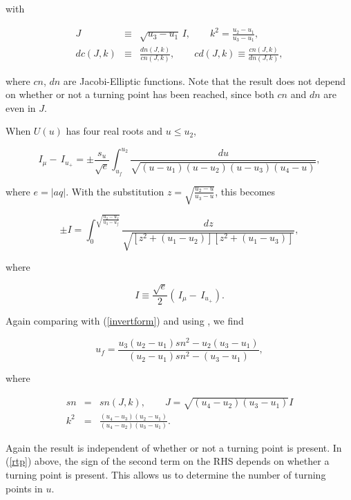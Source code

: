 \documentclass[apj]{emulateapj}
\begin{document}
\noindent with

\begin{eqnarray}
 J &\equiv& \sqrt{u_3-u_1}\hspace{2pt} I, \qquad k^2 = \frac{u_2-u_1}{u_3-u_1}, \\ \nonumber
 dc(J,k) &\equiv& \frac{dn(J,k)}{cn(J,k)},\qquad cd(J,k) \equiv \frac{cn(J,k)}{dn(J,k)},
\end{eqnarray}

\noindent where $cn$, $dn$ are Jacobi-Elliptic functions. Note that the result does not depend on whether or not a turning point has been reached, since both $cn$ and $dn$ are even in $J$.

When $U(u)$ has four real roots and $u \le u_2$, 

\begin{equation}
I_\mu - \hspace{2pt}I_{u_+} = \pm \frac{s_u}{\sqrt{e}}\int_{u_f}^{u_2} \frac{du}{\sqrt{(u-u_1)(u-u_2)(u-u_3)(u_4-u)}},
\end{equation}

\noindent where $e=\vert a q \vert$. With the substitution $z=\sqrt{\frac{u_2-u}{u_3-u}}$, this becomes

\begin{equation}
\pm I = \int_{0}^{\sqrt{\frac{u_2-u_f}{u_3-u_f}}} \frac{dz}{\sqrt{[z^2+(u_1-u_2)][z^2+(u_1-u_3)]}},
\end{equation}

\noindent where 

\begin{equation}
I \equiv \frac{\sqrt{e}}{2} \left(\hspace{2pt}I_\mu - \hspace{2pt}I_{u_+}\right).
\end{equation}

Again comparing with (\ref{invertform}) and using \citet{carlson2005}, we find

\begin{equation}
 u_f=\frac{u_3(u_2-u_1) sn^2 - u_2(u_3-u_1)}{(u_2-u_1)sn^2-(u_3-u_1)},
\end{equation}

\noindent where

\begin{eqnarray}
 sn &=& sn(J,k), \qquad J=\sqrt{(u_4-u_2)(u_3-u_1)}I \\ k^2 &=& \frac{(u_4-u_3)(u_2-u_1)}{(u_4-u_2)(u_3-u_1)}.
\end{eqnarray}

Again the result is independent of whether or not a turning point is present. In (\ref{rtp}) above, the sign of the second term on the RHS depends on whether a turning point is present. This allows us to determine the number of turning points in $u$.
\end{document}
